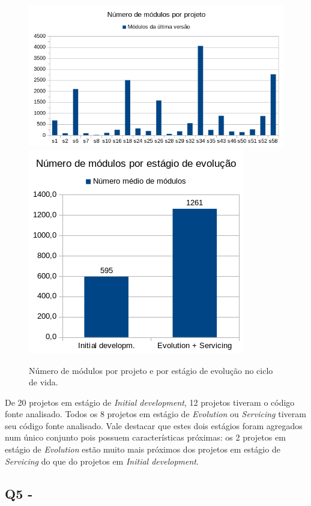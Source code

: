 \begin{figure}[ht]
  \center
  \includegraphics[scale=0.6]{imagens/modules-total.png}
  \includegraphics[scale=0.6]{imagens/modules-average.png}
  \caption{Número de módulos por projeto e por estágio de evolução no ciclo de vida.}
  \label{modules-average}
\end{figure}

De 20 projetos em estágio de {\it Initial development}, 
12 projetos tiveram o código fonte analisado. 
Todos os 8 projetos em estágio de {\it Evolution} ou {\it Servicing}
tiveram seu código fonte analisado.
Vale destacar que estes dois estágios foram agregados num único conjunto 
pois possuem características próximas: 
os 2 projetos em estágio de {\it Evolution} estão
muito mais próximos dos projetos em estágio de {\it Servicing} do que 
do projetos em {\it Initial development}. 

\subsection{Q5 - \QuestaoCinco} %

